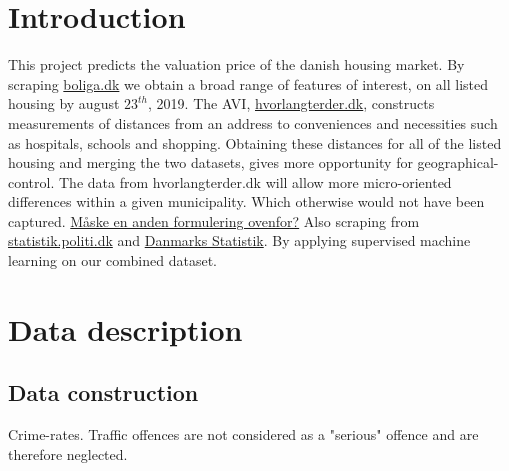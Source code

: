 \documentclass[12pt,a4paper]{article}
\begin{document}

\newpage
\onehalfspacing

\tableofcontents
\newpage
\section{Introduction}
This project predicts the valuation price of the danish housing market. By scraping \href{https://www.boliga.dk}{boliga.dk} we obtain a broad range of features of interest, on all listed housing by august $23^{th}$, 2019. The AVI, \href{https://www.hvorlangterder.dk}{hvorlangterder.dk}, constructs measurements of distances from an address to conveniences and necessities such as hospitals, schools and shopping. Obtaining these distances for all of the listed housing and merging the two datasets, gives more opportunity for geographical-control. The data from hvorlangterder.dk will allow more micro-oriented differences within a given municipality. Which otherwise would not have been captured.  
\newline \underline{Måske en anden formulering ovenfor?}
Also scraping from  \href{https://statistik.politi.dk/QvAJAXZfc/opendoc.htm?document=QlikApplication%2F2999_Public\%2FPublic_IndsatsResultater.qvw}{statistik.politi.dk} and 
\href{https://www.dst.dk/da/Statistik/emner/befolkning-og-valg}{Danmarks Statistik}. 
By applying supervised machine learning on our combined dataset.  
\section{Data description}
\subsection{Data construction}
Crime-rates. Traffic offences are not considered as a "serious" offence and are therefore neglected. 
\end{document}
